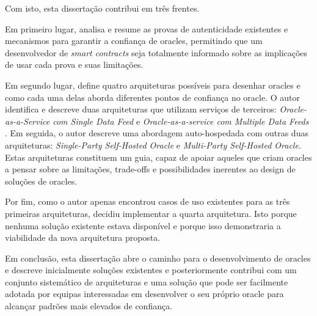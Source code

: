Com isto, esta dissertação contribui em três frentes.

Em primeiro lugar, analisa e resume as provas de autenticidade existentes e mecanismos para garantir a confiança de oracles, permitindo que um desenvolvedor de \textit{smart contracts} seja totalmente informado sobre as implicações de usar cada prova e suas limitações.

Em segundo lugar, define quatro arquiteturas possíveis para desenhar oracles e como cada uma delas aborda diferentes pontos de confiança no oracle. O autor identifica e descreve duas arquiteturas que utilizam serviços de terceiros: \textit{Oracle-as-a-Service com Single Data Feed} e \textit{Oracle-as-a-service com Multiple Data Feeds} . Em seguida, o autor descreve uma abordagem auto-hospedada com outras duas arquiteturas: \textit{Single-Party Self-Hosted Oracle} e \textit{Multi-Party Self-Hosted Oracle}. Estas arquiteturas constituem um guia, capaz de apoiar aqueles que criam oracles a pensar sobre as limitações, trade-offs e possibilidades inerentes ao design de soluções de oracles.

Por fim, como o autor apenas encontrou casos de uso existentes para as três primeiras arquiteturas, decidiu implementar a quarta arquitetura. Isto porque nenhuma solução existente estava disponível e porque isso demonstraria a viabilidade da nova arquitetura proposta.

Em conclusão, esta dissertação abre o caminho para o desenvolvimento de oracles e descreve inicialmente soluções existentes e posteriormente contribui com um conjunto sistemático de arquiteturas e uma solução que pode ser facilmente adotada por equipas interessadas em desenvolver o seu próprio oracle para alcançar padrões mais elevados de confiança.


